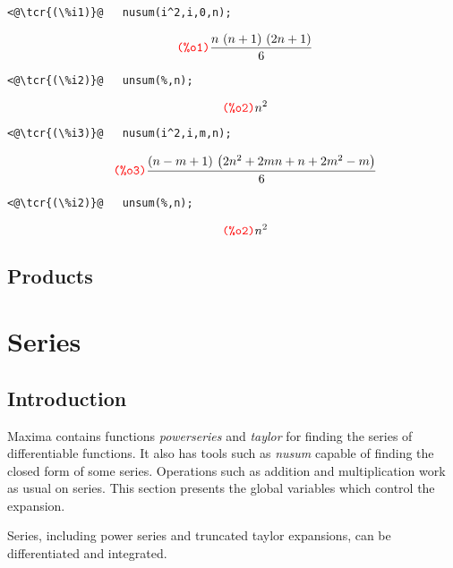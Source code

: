 \documentclass[../Maxima_Workbook.tex]{subfiles}
\begin{document}
\lz \begin{small}
\color{blue} \leqn
\begin{lstlisting}
<@\tcr{(\%i1)}@   nusum(i^2,i,0,n);
\end{lstlisting}
\vspace{-4mm} \[\tag*{\tcr{\ttfamily (\%o1)}} \frac{n\, \left( n+1\right) \, \left( 2 n+1\right) }{6} \]
\vspace{-5mm} \begin{lstlisting}
<@\tcr{(\%i2)}@   unsum(%,n);
\end{lstlisting}
\vspace{-4mm} \[\tag*{\tcr{\ttfamily (\%o2)}} {{n}^{2}} \]
\vspace{-5mm} \begin{lstlisting}
<@\tcr{(\%i3)}@   nusum(i^2,i,m,n);
\end{lstlisting}
\vspace{-4mm} \[\tag*{\tcr{\ttfamily (\%o3)}} \frac{\left( n-m+1\right) \, \left( 2 {{n}^{2}}+2 m n+n+2 {{m}^{2}}-m\right) }{6} \]
\vspace{-5mm} \begin{lstlisting}
<@\tcr{(\%i2)}@   unsum(%,n);
\end{lstlisting}
\vspace{-4mm} \[\tag*{\tcr{\ttfamily (\%o2)}} {{n}^{2}} \]
\color{black} \reqn
\end{small} \vspace{-7mm}

\subsection{Products}

\section{Series}

\subsection{Introduction}

Maxima contains functions \emph{powerseries} and \emph{taylor} for finding the series of differentiable functions. It also has tools such as \emph{nusum} capable of finding the closed form of some series. Operations such as addition and multiplication work as usual on series. This section presents the global variables which control the expansion.

\lz Series, including power series and truncated taylor expansions, can be differentiated and integrated.
\end{document}
